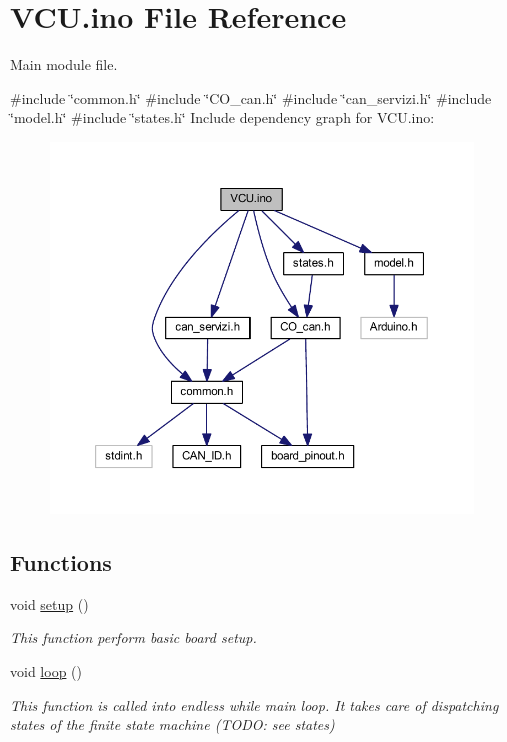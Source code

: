 \hypertarget{_v_c_u_8ino}{}\section{V\+C\+U.\+ino File Reference}
\label{_v_c_u_8ino}


Main module file.  


{\ttfamily \#include \char`\"{}common.\+h\char`\"{}}\newline
{\ttfamily \#include \char`\"{}C\+O\+\_\+can.\+h\char`\"{}}\newline
{\ttfamily \#include \char`\"{}can\+\_\+servizi.\+h\char`\"{}}\newline
{\ttfamily \#include \char`\"{}model.\+h\char`\"{}}\newline
{\ttfamily \#include \char`\"{}states.\+h\char`\"{}}\newline
Include dependency graph for V\+C\+U.\+ino\+:\nopagebreak
\begin{figure}[H]
\begin{center}
\leavevmode
\includegraphics[width=350pt]{_v_c_u_8ino__incl}
\end{center}
\end{figure}
\subsection*{Functions}
\begin{DoxyCompactItemize}
\item 
void \mbox{\hyperlink{_v_c_u_8ino_a4fc01d736fe50cf5b977f755b675f11d}{setup}} ()
\begin{DoxyCompactList}\small\item\em This function perform basic board setup. \end{DoxyCompactList}\item 
void \mbox{\hyperlink{_v_c_u_8ino_afe461d27b9c48d5921c00d521181f12f}{loop}} ()
\begin{DoxyCompactList}\small\item\em This function is called into endless while main loop. It takes care of dispatching states of the finite state machine (T\+O\+DO\+: see states) \end{DoxyCompactList}\end{DoxyCompactItemize}


